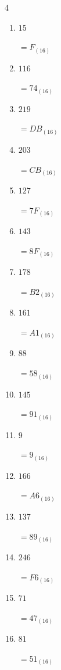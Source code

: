 \begin{multicols}{4}
\begin{enumerate}
        $=24_{(16)}$

  \item $15$

        $=F_{(16)}$

  \item $116$

        $=74_{(16)}$

  \item $219$

        $=DB_{(16)}$

  \item $203$

        $=CB_{(16)}$

  \item $127$

        $=7F_{(16)}$

  \item $143$

        $=8F_{(16)}$

  \item $178$

        $=B2_{(16)}$

\columnbreak %

  \item $161$

        $=A1_{(16)}$

  \item $88$

        $=58_{(16)}$

  \item $145$

        $=91_{(16)}$

  \item $9$

        $=9_{(16)}$

  \item $166$

        $=A6_{(16)}$

  \item $137$

        $=89_{(16)}$

  \item $246$

        $=F6_{(16)}$

  \item $71$

        $=47_{(16)}$

  \item $81$

        $=51_{(16)}$


\end{enumerate}
\end{multicols}
